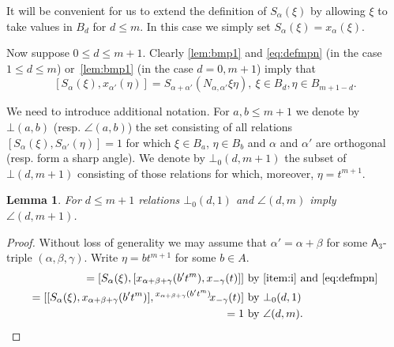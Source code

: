 \documentclass[oneside, 10pt]{amsart}
\newcommand{\rA}{\mathsf{A}}
\numberwithin{equation}{section}
\newtheorem{lemma}{Lemma}
\numberwithin{lemma}{section}
\theoremstyle{definition}
\theoremstyle{remark}
\begin{document}
It will be convenient for us to extend the definition of $S_\alpha(\xi)$ by allowing $\xi$ to take values in $B_d$ for $d\leq m$.
In this case we simply set $S_\alpha(\xi) = x_\alpha(\xi)$.

Now suppose  $0 \leq d \leq m+1$. Clearly \eqref{lem:bmp1} and \eqref{eq:defmpn} (in the case $1\leq d\leq m$) or~\cref{lem:bmp1} (in the case $d=0,m+1$) imply that
\begin{equation} \label{eq:verify-bmp1'} 
[S_\alpha(\xi), x_{\alpha'}(\eta)] = S_{\alpha+\alpha'}(N_{\alpha,\alpha'}\xi \eta),\ \xi \in B_d, \eta \in B_{m+1-d}.
\end{equation}

We need to introduce additional notation.
For $a,b\leq m+1$ we denote by $\bot(a, b)$ (resp. $\angle(a,b)$) the set consisting of all relations $[S_\alpha(\xi), S_{\alpha'}(\eta)] = 1$
for which $\xi \in B_a$, $\eta \in B_b$ and $\alpha$ and $\alpha'$ are orthogonal (resp. form a sharp angle). 
We denote by $\bot_0(d, m+1)$ the subset of $\bot(d, m+1)$
consisting of those relations for which, moreover, $\eta = t^{m+1}$.

\begin{lemma} \label{claim1} For $d\leq m+1$ relations $\bot_0(d, 1)$ and $\angle(d, m)$ imply $\angle(d, m+1)$. \end{lemma}
\begin{proof}
Without loss of generality we may assume that $\alpha' = \alpha + \beta$
  for some $\rA_3$-triple $(\alpha, \beta, \gamma)$.
Write $\eta = bt^{m+1}$ for some $b\in A$.
\begin{align*} 
[S_\alpha(\xi), S_{\alpha+\beta}(bt^{m+1})] = [S_\alpha(\xi), [x_{\alpha+\beta+\gamma}(b't^m), x_{-\gamma}(t)]] & \text{ by~\eqref{item:i} and~\eqref{eq:defmpn}}\\
= [[S_\alpha(\xi), x_{\alpha+\beta+\gamma}(b't^m)], {}^{x_{\alpha+\beta+\gamma}(b't^m)}\!x_{-\gamma}(t)] & \text{ by~$\bot_0(d, 1)$}\\
= 1
 & \text{ by~$\angle(d, m)$. \qedhere} \end{align*} 
\end{proof}
\end{document}
